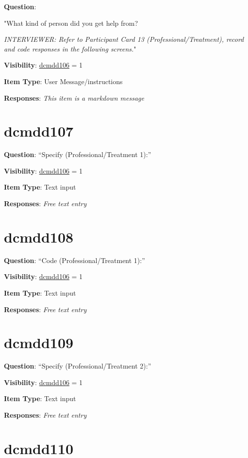 \documentclass[
]{book}
\begin{document}
\textbf{Question}:

"What kind of person did you get help from?

\emph{INTERVIEWER: Refer to Participant Card 13 (Professional/Treatment), record and code responses in the following screens.}"

\textbf{Visibility}: \protect\hyperlink{dcmdd106}{dcmdd106} = 1

\textbf{Item Type}: User Message/instructions

\textbf{Responses}: \emph{This item is a markdown message}

\hypertarget{dcmdd107}{%
\section{dcmdd107}\label{dcmdd107}}

\textbf{Question}: ``Specify (Professional/Treatment 1):''

\textbf{Visibility}: \protect\hyperlink{dcmdd106}{dcmdd106} = 1

\textbf{Item Type}: Text input

\textbf{Responses}: \emph{Free text entry}

\hypertarget{dcmdd108}{%
\section{dcmdd108}\label{dcmdd108}}

\textbf{Question}: ``Code (Professional/Treatment 1):''

\textbf{Visibility}: \protect\hyperlink{dcmdd106}{dcmdd106} = 1

\textbf{Item Type}: Text input

\textbf{Responses}: \emph{Free text entry}

\hypertarget{dcmdd109}{%
\section{dcmdd109}\label{dcmdd109}}

\textbf{Question}: ``Specify (Professional/Treatment 2):''

\textbf{Visibility}: \protect\hyperlink{dcmdd106}{dcmdd106} = 1

\textbf{Item Type}: Text input

\textbf{Responses}: \emph{Free text entry}

\hypertarget{dcmdd110}{%
\section{dcmdd110}\label{dcmdd110}}
\end{document}

